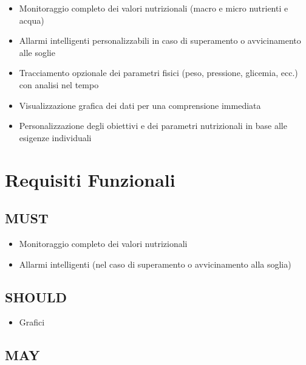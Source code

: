 \documentclass[11pt,a4paper]{article}
\begin{document}
    \begin{itemize}
        \item Monitoraggio completo dei valori nutrizionali (macro e micro nutrienti e acqua)

        \item Allarmi intelligenti personalizzabili in caso di superamento o avvicinamento alle soglie

        \item Tracciamento opzionale dei parametri fisici (peso, pressione, glicemia, ecc.) con analisi nel tempo

        \item Visualizzazione grafica dei dati per una comprensione immediata

        \item Personalizzazione degli obiettivi e dei parametri nutrizionali in base alle esigenze individuali

    \end{itemize}


    \section*{Requisiti Funzionali}

    \subsection*{MUST}

    \begin{itemize}
        \item Monitoraggio completo dei valori nutrizionali

        \item Allarmi intelligenti (nel caso di superamento o avvicinamento alla soglia)

    \end{itemize}

    \subsection*{SHOULD}

    \begin{itemize}
        \item Grafici
    \end{itemize}

    \subsection*{MAY}
\end{document}
